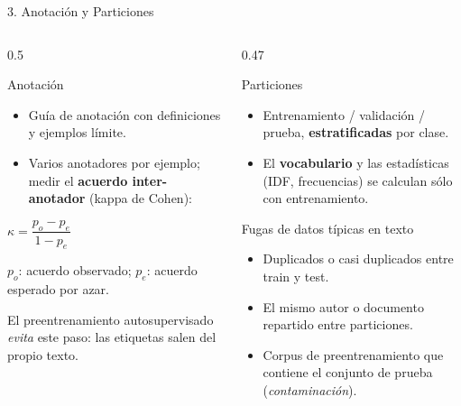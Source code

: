 \documentclass[aspectratio=169, 10pt]{beamer}
\newcommand{\formula}[1]{%
	\begin{tcolorbox}[colback=UCMBlue!8, colframe=UCMBlue, arc=4pt,
		boxsep=2pt, left=6pt, right=6pt, top=3pt, bottom=3pt]
		#1
	\end{tcolorbox}
}
\begin{document}
\begin{frame}{3. Anotaci\'on y Particiones}

	\begin{columns}[T]
		\begin{column}{0.5\textwidth}
			\begin{block}{Anotaci\'on}
				\small
				\begin{itemize}
					\item Gu\'ia de anotaci\'on con definiciones y ejemplos l\'imite.
					\item Varios anotadores por ejemplo; medir el \textbf{acuerdo inter-anotador} (kappa de Cohen):
				\end{itemize}
				\formula{\centering $\kappa = \dfrac{p_o - p_e}{1 - p_e}$}
				\scriptsize $p_o$: acuerdo observado; $p_e$: acuerdo esperado por azar.
			\end{block}

			{\small El preentrenamiento autosupervisado \emph{evita} este paso: las etiquetas salen del propio texto.}
		\end{column}

		\begin{column}{0.47\textwidth}
			\begin{block}{Particiones}
				\small
				\begin{itemize}
					\item Entrenamiento / validaci\'on / prueba, \textbf{estratificadas} por clase.
					\item El \textbf{vocabulario} y las estad\'isticas (IDF, frecuencias) se calculan s\'olo con entrenamiento.
				\end{itemize}
			\end{block}

			\begin{alertblock}{Fugas de datos t\'ipicas en texto}
				\small
				\begin{itemize}
					\item Duplicados o casi duplicados entre train y test.
					\item El mismo autor o documento repartido entre particiones.
					\item Corpus de preentrenamiento que contiene el conjunto de prueba (\emph{contaminaci\'on}).
				\end{itemize}
			\end{alertblock}
		\end{column}
	\end{columns}

\end{frame}
\end{document}
